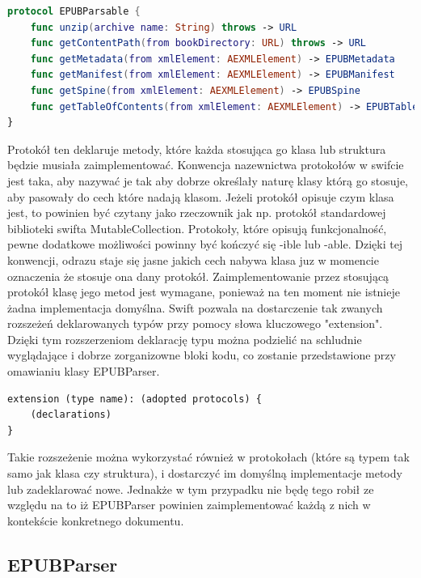 \begin{lstlisting}[caption={Protokół EPUBParsable.}, language=swift]
protocol EPUBParsable {
    func unzip(archive name: String) throws -> URL
    func getContentPath(from bookDirectory: URL) throws -> URL
    func getMetadata(from xmlElement: AEXMLElement) -> EPUBMetadata
    func getManifest(from xmlElement: AEXMLElement) -> EPUBManifest
    func getSpine(from xmlElement: AEXMLElement) -> EPUBSpine
    func getTableOfContents(from xmlElement: AEXMLElement) -> EPUBTableOfContents
}
\end{lstlisting}

Protokół ten deklaruje metody, które każda stosująca go klasa lub struktura będzie musiała zaimplementować. Konwencja nazewnictwa protokołów w swifcie jest taka, aby nazywać je tak aby dobrze określały naturę klasy którą go stosuje, aby pasowały do cech które nadają klasom. Jeżeli protokół opisuje czym klasa jest, to powinien być czytany jako rzeczownik jak np. protokół standardowej biblioteki swifta MutableCollection. Protokoły, które opisują funkcjonalność, pewne dodatkowe możliwości powinny być kończyć się -ible lub -able. Dzięki tej konwencji, odrazu staje się jasne jakich cech nabywa klasa juz w momencie oznaczenia że stosuje ona dany protokół. Zaimplementowanie przez stosującą protokół klasę jego metod jest wymagane, ponieważ na ten moment nie istnieje żadna implementacja domyślna. Swift pozwala na dostarczenie tak zwanych rozszeżeń deklarowanych typów przy pomocy słowa kluczowego "extension". Dzięki tym rozszerzeniom deklarację typu można podzielić na schludnie wyglądające i dobrze zorganizowne bloki kodu, co zostanie przedstawione przy omawianiu klasy EPUBParser.

\begin{lstlisting}[caption={Deklaracja wyrażenia "extension"\cite{theSwiftProgrammingLanguageDeclarations}.},language=swift-reference]
extension (type name): (adopted protocols) {
    (declarations)
}
\end{lstlisting}

Takie rozszeżenie można wykorzystać również w protokołach (które są typem tak samo jak klasa czy struktura), i dostarczyć im domyślną implementacje metody lub zadeklarować nowe. Jednakże w tym przypadku nie będę tego robił ze względu na to iż EPUBParser powinien zaimplementować każdą z nich w kontekście konkretnego dokumentu.

\subsection{EPUBParser}

